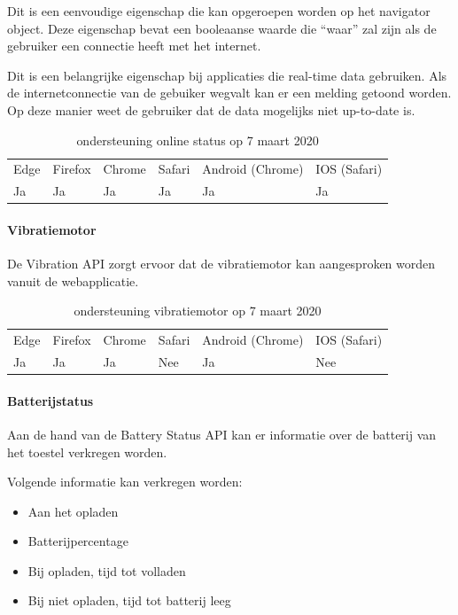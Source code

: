 Dit is een eenvoudige eigenschap die kan opgeroepen worden op het navigator object. Deze eigenschap bevat een booleaanse waarde die “waar” zal zijn als de gebruiker een connectie heeft met het internet. 

Dit is een belangrijke eigenschap bij applicaties die real-time data gebruiken. Als de internetconnectie van de gebuiker wegvalt kan er een melding  getoond worden. Op deze manier weet de gebruiker dat de data mogelijks niet up-to-date is.
\begin{table}[H]
	\centering
	\begin{tabular}{llllll}
		Edge & Firefox & Chrome & Safari & Android (Chrome) & IOS (Safari) \\
		Ja   & Ja      &  Ja     & Ja     & Ja               & Ja          
	\end{tabular}	
	\caption{ondersteuning online status op 7 maart 2020}
\end{table}

\paragraph{Vibratiemotor }

De Vibration API \autocite{Kostionen2018} zorgt ervoor dat de vibratiemotor kan aangesproken worden vanuit de webapplicatie.

\begin{table}[H]
	\begin{tabular}{llllll}
		Edge & Firefox & Chrome & Safari & Android (Chrome) & IOS (Safari) \\
		Ja   & Ja      &  Ja     & Nee     & Ja               & Nee          
	\end{tabular}	
	\caption{ondersteuning vibratiemotor  op 7 maart 2020}
\end{table}


\paragraph{Batterijstatus}

Aan de hand van de Battery Status API \autocite{Kostiainen2016} kan er informatie over de batterij van het toestel verkregen worden.

Volgende informatie kan verkregen worden:
 \begin{itemize}
	\item	Aan het opladen
	\item	Batterijpercentage
	\item	Bij opladen, tijd tot volladen
	\item	Bij niet opladen, tijd tot batterij leeg
\end{itemize}

